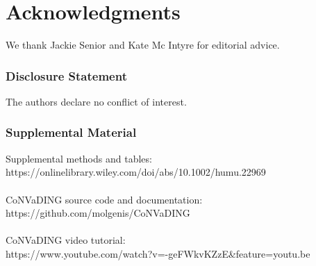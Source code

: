 \section{Acknowledgments}\label{Acknowledgments} 
We thank Jackie Senior and Kate Mc Intyre for editorial advice.


\subsubsection{Disclosure Statement} 
The authors declare no conflict of interest.

\subsubsection{Supplemental Material}
Supplemental methods and tables: \\ https://onlinelibrary.wiley.com/doi/abs/10.1002/humu.22969 \\
\\
CoNVaDING source code and documentation: \\ https://github.com/molgenis/CoNVaDING  \\
\\
CoNVaDING video tutorial: \\ https://www.youtube.com/watch?v=-geFWkvKZzE\&feature=youtu.be
